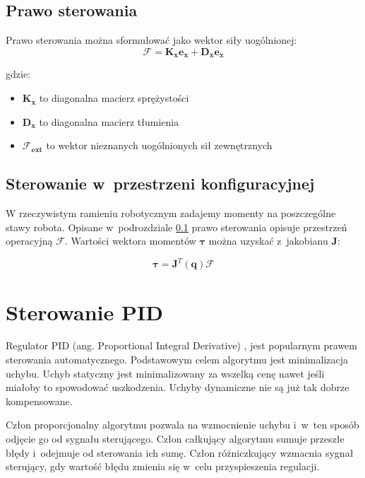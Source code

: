 \subsection{Prawo sterowania}
\label{sec:impedancyjne}

Prawo sterowania można sformułować  jako wektor siły uogólnionej:
\begin{equation}
\boldsymbol{\mathcal{F}} = \boldsymbol{K_x}\boldsymbol{e_x} + \boldsymbol{D_x}\dot{\boldsymbol{e_x}}
\end{equation}

gdzie:
\begin{itemize}
\item $\boldsymbol{K_x}$ to diagonalna macierz sprężystości
\item $\boldsymbol{D_x}$ to diagonalna macierz tłumienia
\item $\boldsymbol{\mathcal{F}_{ext}}$ to wektor nieznanych uogólnionych sił zewnętrznych
\end{itemize}

\subsection{Sterowanie w~przestrzeni konfiguracyjnej}
\label{chap:jakobian}
W rzeczywistym ramieniu robotycznym zadajemy momenty na poszczególne stawy robota. Opisane w~podrozdziale \ref{sec:impedancyjne} prawo sterowania opisuje przestrzeń operacyjną $\boldsymbol{\mathcal{F}}$.  Wartości wektora momentów $\boldsymbol{\tau}$ można uzyskać z~jakobianu $\boldsymbol{J}$:

\begin{equation}
\boldsymbol{\tau} = \boldsymbol{J}^T(\boldsymbol{q})\boldsymbol{\mathcal{F}}
\end{equation}

\section{Sterowanie PID}
\label{chap:key}
Regulator PID (ang. Proportional Integral Derivative) \cite{bib:pidTito}, \cite{bib:pidMimo} jest popularnym prawem sterowania automatycznego. Podstawowym celem algorytmu jest minimalizacja uchybu. Uchyb statyczny jest minimalizowany za wszelką cenę nawet jeśli miałoby to spowodować uszkodzenia. Uchyby dynamiczne nie są już tak dobrze kompensowane.

Człon proporcjonalny algorytmu pozwala na wzmocnienie uchybu i~w~ten sposób odjęcie go od sygnału sterującego. Człon całkujący algorytmu sumuje przeszłe błędy i~odejmuje od sterowania ich sumę. Człon różniczkujący wzmacnia sygnał sterujący, gdy wartość błędu zmienia się w~celu przyspieszenia regulacji.
